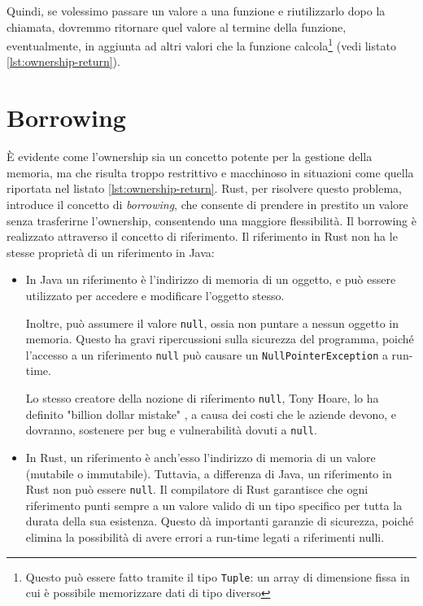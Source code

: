 Quindi, se volessimo passare un valore a una funzione e riutilizzarlo dopo la chiamata, dovremmo ritornare quel valore al termine della funzione, eventualmente, in aggiunta ad altri valori che la funzione calcola\footnote{Questo può essere fatto tramite il tipo \texttt{Tuple}: un array di dimensione fissa in cui è possibile memorizzare dati di tipo diverso} (vedi listato \ref{lst:ownership-return}). 

\section{Borrowing}
\label{sec:borrowing}
È evidente come l'ownership sia un concetto potente per la gestione della memoria, ma che risulta troppo restrittivo e macchinoso in situazioni come quella riportata nel listato \ref{lst:ownership-return}. Rust, per risolvere questo problema, introduce il concetto di \textit{borrowing}, che consente di prendere in prestito un valore senza trasferirne l'ownership, consentendo una maggiore flessibilità. Il borrowing è realizzato attraverso il concetto di riferimento. Il riferimento in Rust non ha le stesse proprietà di un riferimento in Java: 
\begin{itemize}
    \item In Java un riferimento è l'indirizzo di memoria di un oggetto, e può essere utilizzato per accedere e modificare l'oggetto stesso. 
    
    Inoltre, può assumere il valore \texttt{null}, ossia non puntare a nessun oggetto in memoria. Questo ha gravi ripercussioni sulla sicurezza del programma, poiché l'accesso a un riferimento \texttt{null} può causare un \texttt{NullPointerException} a run-time. 
    
    Lo stesso creatore della nozione di riferimento \texttt{null}, Tony Hoare, lo ha definito "billion dollar mistake" \cite{hoare-null-reference}, a causa dei costi che le aziende devono, e dovranno, sostenere per bug e vulnerabilità dovuti a \texttt{null}.
    \item In Rust, un riferimento è anch'esso l'indirizzo di memoria di un valore (mutabile o immutabile). Tuttavia, a differenza di Java, un riferimento in Rust non può essere \texttt{null}. Il compilatore di Rust garantisce che ogni riferimento punti sempre a un valore valido di un tipo specifico per tutta la durata della sua esistenza. Questo dà importanti garanzie di sicurezza, poiché elimina la possibilità di avere errori a run-time legati a riferimenti nulli.
\end{itemize}
